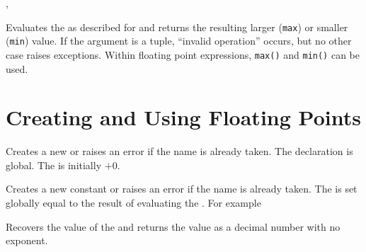 \documentclass[oneside]{book}
\begin{document}
\begin{function}{\fpMathMax,\fpMathMin}
\begin{syntax}
  
  
\end{syntax}
Evaluates the  as described for 
and returns the resulting larger (\texttt{max}) or smaller (\texttt{min}) value.
If the argument is a tuple, \enquote{invalid operation} occurs,
but no other case raises exceptions. Within floating point expressions,
\verb|max()| and \verb|min()| can be used.
\end{function}

\section{Creating and Using Floating Points}

\begin{function}{\fpNew}
\begin{syntax}
 
\end{syntax}
Creates a new  or raises an error if the name is
already taken. The declaration is global. The  is
initially $+0$.
\end{function}

\begin{function}{\fpConst}
\begin{syntax}
  
\end{syntax}
Creates a new constant  or raises an error if the name
is already taken. The  is set globally equal to
the result of evaluating the .
For example
\begin{demohigh}
\fpConst {}
\fpUse \cMyPiFp
\end{demohigh}
\end{function}

\begin{function}{\fpUse}
\begin{syntax}
 
\end{syntax}
Recovers the value of the  and returns the value as a
decimal number with no exponent.
\end{function}
\end{document}
